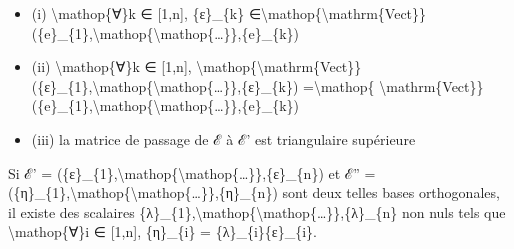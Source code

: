 \documentclass[]{article}
\begin{document}
\begin{itemize}
\itemsep1pt\parskip0pt
\item
  (i) \textbackslash{}mathop\{∀\}k ∈ {[}1,n{]}, \{ε\}\_\{k\}
  ∈\textbackslash{}mathop\{\textbackslash{}mathrm\{Vect\}\}(\{e\}\_\{1\},\textbackslash{}mathop\{\textbackslash{}mathop\{\ldots{}\}\},\{e\}\_\{k\})
\item
  (ii) \textbackslash{}mathop\{∀\}k ∈ {[}1,n{]},
  \textbackslash{}mathop\{\textbackslash{}mathrm\{Vect\}\}(\{ε\}\_\{1\},\textbackslash{}mathop\{\textbackslash{}mathop\{\ldots{}\}\},\{ε\}\_\{k\})
  =\textbackslash{}mathop\{
  \textbackslash{}mathrm\{Vect\}\}(\{e\}\_\{1\},\textbackslash{}mathop\{\textbackslash{}mathop\{\ldots{}\}\},\{e\}\_\{k\})
\item
  (iii) la matrice de passage de ℰ à ℰ' est triangulaire supérieure
\end{itemize}

Si ℰ' =
(\{ε\}\_\{1\},\textbackslash{}mathop\{\textbackslash{}mathop\{\ldots{}\}\},\{ε\}\_\{n\})
et ℰ'' =
(\{η\}\_\{1\},\textbackslash{}mathop\{\textbackslash{}mathop\{\ldots{}\}\},\{η\}\_\{n\})
sont deux telles bases orthogonales, il existe des scalaires
\{λ\}\_\{1\},\textbackslash{}mathop\{\textbackslash{}mathop\{\ldots{}\}\},\{λ\}\_\{n\}
non nuls tels que \textbackslash{}mathop\{∀\}i ∈ {[}1,n{]}, \{η\}\_\{i\}
= \{λ\}\_\{i\}\{ε\}\_\{i\}.
\end{document}
